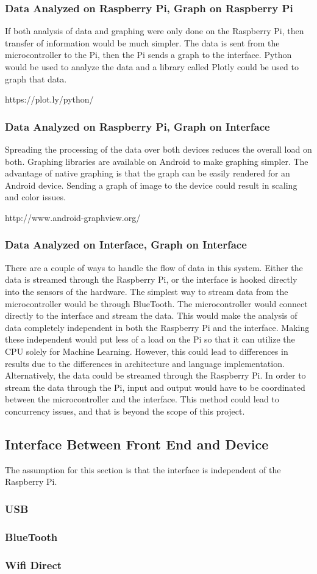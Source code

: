 \documentclass[draftclsnofoot,onecolumn,letterpaper,10pt]{IEEEtran}
\begin{document}
\subsubsection{Data Analyzed on Raspberry Pi, Graph on Raspberry Pi}
If both analysis of data and graphing were only done on the Raspberry Pi, then transfer of information would be much simpler.
The data is sent from the microcontroller to the Pi, then the Pi sends a graph to the interface.
Python would be used to analyze the data and a library called Plotly could be used to graph that data.


https://plot.ly/python/

\subsubsection{Data Analyzed on Raspberry Pi, Graph on Interface}
Spreading the processing of the data over both devices reduces the overall load on both.
Graphing libraries are available on Android to make graphing simpler.
The advantage of native graphing is that the graph can be easily rendered for an Android device.
Sending a graph of image to the device could result in scaling and color issues.

http://www.android-graphview.org/

\subsubsection{Data Analyzed on Interface, Graph on Interface}
There are a couple of ways to handle the flow of data in this system.
Either the data is streamed through the Raspberry  Pi, or the interface is hooked directly into the sensors of the hardware.
The simplest way to stream data from the microcontroller would be through BlueTooth.
The microcontroller would connect directly to the interface and stream the data.
This would make the analysis of data completely independent in both the Raspberry Pi and the interface.
Making these independent would put less of a load on the Pi so that it can utilize the CPU solely for Machine Learning.
However, this could lead to differences in results due to the differences in architecture and language implementation.
Alternatively, the data could be streamed through the Raspberry Pi.
In order to stream the data through the Pi, input and output would have to be coordinated between the microcontroller and the interface.
This method could lead to concurrency issues, and that is beyond the scope of this project.


\subsection{Interface Between Front End and Device}
The assumption for this section is that the interface is independent of the Raspberry Pi.

\subsubsection{USB}


\subsubsection{BlueTooth}


\subsubsection{Wifi Direct}




\end{document}
